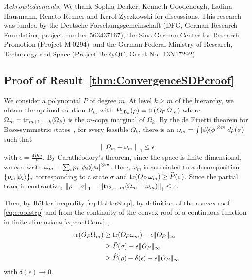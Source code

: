 \documentclass[aps,pra,onecolumn,superscriptaddress]{revtex4-2}
\begin{document}
{\em Acknowledgements.} We thank Sophia Denker, Kenneth Goodenough, Ladina Hausmann, Renato
Renner and Karol \.Zyczkowski for discussions.
This research was funded by the Deutsche Forschungsgemeinschaft (DFG, German Research Foundation, project number 563437167), the Sino-German Center for Research Promotion (Project M-0294), and the German Federal Ministry of Research, Technology and Space (Project BeRyQC, Grant No.\ 13N17292).

\newpage




\begin{widetext}

\appendix

\section{Proof of Result~\ref{thm:ConvergenceSDPcroof}}\label{app:ProofCongNonExtHier}
We consider a polynomial $P$ of degree $m$. At level $k \geq m$ of the hierarchy, we obtain the optimal solution $\Omega_k$, with $P_{{\rm LB}_k}(\rho) = \tr(O_P\, \Omega_m)$ where $\Omega_m = \tr_{m+1,\dots, k}(\Omega_k)$ is the $m$-copy marginal of $\Omega_k$.
By the de Finetti theorem for Bose-symmetric states~\cite[Thm.~II.8]{Christandl_2007}, for every feasible $\Omega_k$, there is an $\omega_m = \int \dyad{\phi}^{\otimes m} d\mu(\phi)$ such that
\begin{equation}
    \left\|\Omega_m - \omega_m\right\|_1 \leq \epsilon
\end{equation}
with $\epsilon = \tfrac{4 D m}{k}$. By Carath\'eodory's theorem, since the space is finite-dimensional, we can write $\omega_m = \sum_i p_i \dyad{\phi_i}^{\otimes m}$. Here, $\omega_m$ is associated to a decomposition $\{p_i, \ket{\phi_i}\}_i$ corresponding to a state $\sigma$ and $\tr(O_P \,\omega_m) \geq \widehat{P}(\sigma)$. Since the partial trace is contractive, $\left\|\rho - \sigma\right\|_1 = \left\|\tr_{2,\dots, m}(\Omega_m - \omega_m)\right\|_1 \leq \epsilon$.

Then, by H\"{o}lder inequality \eqref{eq:HolderStep}, by definition of the convex roof \eqref{eq:croofstep} and from the continuity of the convex roof of a continuous function in finite dimensions \eqref{eq:contConv}~\cite[Thm.~6.1]{Bucicovschi2013},
\begin{align}
    \tr(O_P \Omega_m) &\geq \tr(O_P\omega_m) - \epsilon\|O_P\|_\infty \label{eq:HolderStep}\\
    &\geq \widehat{P}(\sigma) - \epsilon\|O_P\|_\infty \label{eq:croofstep}\\
    &\geq \widehat{P}(\rho) - \delta(\epsilon) - \epsilon\|O_P\|_\infty \label{eq:contConv}
\end{align}
with $\delta(\epsilon) \to 0$.


\end{widetext}
\end{document}
